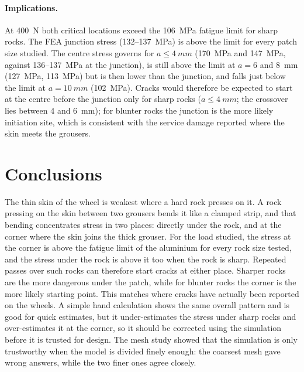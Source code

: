 \documentclass[10pt,a4paper]{article}
\begin{document}
\paragraph{Implications.}
At \SI{400}{N} both critical locations exceed the \SI{106}{MPa} fatigue limit for sharp rocks. The FEA junction stress (132--\SI{137}{MPa}) is above the limit for every patch size studied. The centre stress governs for $a \le \SI{4}{mm}$ (\SI{170}{MPa} and \SI{147}{MPa}, against 136--\SI{137}{MPa} at the junction), is still above the limit at $a = 6$ and \SI{8}{mm} (\SI{127}{MPa}, \SI{113}{MPa}) but is then lower than the junction, and falls just below the limit at $a = \SI{10}{mm}$ (\SI{102}{MPa}). Cracks would therefore be expected to start at the centre before the junction only for sharp rocks ($a \le \SI{4}{mm}$; the crossover lies between 4 and \SI{6}{mm}); for blunter rocks the junction is the more likely initiation site, which is consistent with the service damage reported where the skin meets the grousers.

\section{Conclusions}

The thin skin of the wheel is weakest where a hard rock presses on it. A rock pressing on the skin between two grousers bends it like a clamped strip, and that bending concentrates stress in two places: directly under the rock, and at the corner where the skin joins the thick grouser. For the load studied, the stress at the corner is above the fatigue limit of the aluminium for every rock size tested, and the stress under the rock is above it too when the rock is sharp. Repeated passes over such rocks can therefore start cracks at either place. Sharper rocks are the more dangerous under the patch, while for blunter rocks the corner is the more likely starting point. This matches where cracks have actually been reported on the wheels. A simple hand calculation shows the same overall pattern and is good for quick estimates, but it under-estimates the stress under sharp rocks and over-estimates it at the corner, so it should be corrected using the simulation before it is trusted for design. The mesh study showed that the simulation is only trustworthy when the model is divided finely enough: the coarsest mesh gave wrong answers, while the two finer ones agree closely.

\FloatBarrier
\end{document}
